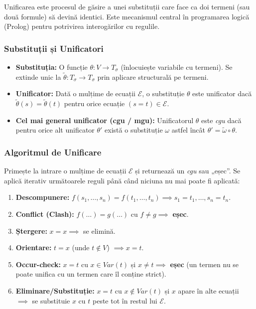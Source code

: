 Unificarea este procesul de găsire a unei substituții care face ca doi termeni (sau două formule) să devină identici. Este mecanismul central în programarea logică (Prolog) pentru potrivirea interogărilor cu regulile.

\subsubsection{Substituții și Unificatori}
\begin{itemize}
	\item \textbf{Substituția:} O funcție $\theta : V \to T_\sigma$ (înlocuiește variabile cu termeni). Se extinde unic la $\tilde{\theta} : T_\sigma \to T_\sigma$ prin aplicare structurală pe termeni.
	\item \textbf{Unificator:} Dată o mulțime de ecuații $\mathcal{E}$, o substituție $\theta$ este unificator dacă $\tilde{\theta}(s) = \tilde{\theta}(t)$ pentru orice ecuație $(s=t) \in \mathcal{E}$.
	\item \textbf{Cel mai general unificator (cgu / mgu):} Unificatorul $\theta$ este \textit{cgu} dacă pentru orice alt unificator $\theta'$ există o substituție $\omega$ astfel încât $\theta' = \tilde{\omega} \circ \theta$.
\end{itemize}

\subsubsection{Algoritmul de Unificare}
Primește la intrare o mulțime de ecuații $\mathcal{E}$ și returnează un \textit{cgu} sau „eșec”. Se aplică iterativ următoarele reguli până când niciuna nu mai poate fi aplicată:
\begin{enumerate}
	\item \textbf{Descompunere:} $f(s_1, \dots, s_n) = f(t_1, \dots, t_n) \implies s_1=t_1, \dots, s_n=t_n$.
	\item \textbf{Conflict (Clash):} $f(\dots) = g(\dots)$ cu $f \neq g \implies$ \textbf{eșec}.
	\item \textbf{Ștergere:} $x = x \implies$ se elimină.
	\item \textbf{Orientare:} $t = x$ (unde $t \notin V$) $\implies x = t$.
	\item \textbf{Occur-check:} $x = t$ cu $x \in Var(t)$ și $x \neq t \implies$ \textbf{eșec} (un termen nu se poate unifica cu un termen care îl conține strict).
	\item \textbf{Eliminare/Substituție:} $x = t$ cu $x \notin Var(t)$ și $x$ apare în alte ecuații $\implies$ se substituie $x$ cu $t$ peste tot în restul lui $\mathcal{E}$.
\end{enumerate}

